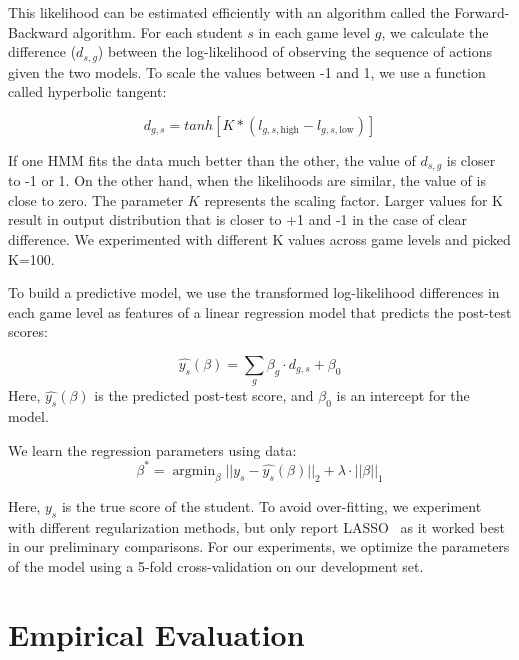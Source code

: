 \documentclass{sigchi}
\DeclareMathOperator*{\argmin}{argmin}
\begin{document}
	This likelihood can be estimated efficiently with an algorithm called the Forward-Backward algorithm. 
	For each student $s$ in each game level $g$, we calculate the difference ($d_{s,g}$) between the log-likelihood of observing the sequence of actions given the two models. 
	To scale the values between -1 and 1, we use a function called hyperbolic tangent: 
	
	\begin{equation}
	d_{g,s} = tanh[ K * (l_{g, s, \text{high}} - l_{g, s, \text{low}})]
	\end{equation}
	
 	If one HMM fits the data much better than the other, the value of $d_{s,g}$ is closer to -1 or 1.
	On the other hand, when the likelihoods are similar,  the value of is close to zero. 
	The parameter $K$ represents the scaling factor.
	Larger values for K result in output distribution that is closer to +1 and -1 in the case of clear difference.
	We experimented with different K values across game levels and picked K=100.

	To build a predictive model,  we use the transformed log-likelihood differences in each game level as features of a linear regression model that predicts the post-test scores:

	\begin{equation}
	\hat {y_s}(\beta) =   \sum_g \beta_g \cdot d_{g,s}  + \beta_0
	\end{equation}
	Here, $\hat {y_s}(\beta)$ is the predicted post-test score, and $\beta_0$ is an intercept for the  model.  
	
	We learn the regression parameters using data:
	\begin{equation}
	\beta^* = \argmin_\beta || y_s - \hat{y_s}(\beta)  ||_2 + \lambda \cdot || \beta ||_1
	\end{equation}
	
	Here, $y_s$ is the true score of the student.
	To avoid over-fitting, we experiment with different regularization methods, but only report LASSO~\cite{tibshirani1996regression} as it worked best in our preliminary comparisons.
	For our experiments, we optimize the parameters of the model using a 5-fold cross-validation on our development set.

	
	\section{Empirical Evaluation}
	\label{sec:experiments}
	
\end{document}
